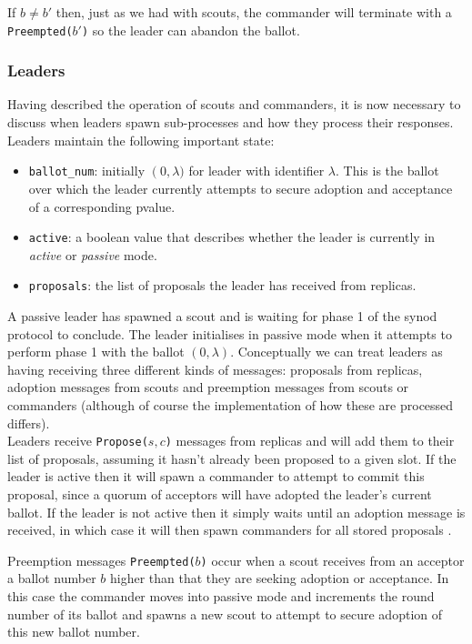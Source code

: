 If $b \neq b'$ then, just as we had with scouts, the commander will terminate with a  \texttt{Preempted($b'$)} so the leader can abandon the ballot.

\subsubsection{Leaders}

Having described the operation of scouts and commanders, it is now necessary to discuss when leaders spawn sub-processes and how they process their responses. Leaders maintain the following important state:

\begin{itemize}
  \item \texttt{ballot\_num}: initially $\left(0,\lambda)$ for leader with identifier $\lambda$. This is the ballot over which the leader currently attempts to secure adoption and acceptance of a corresponding pvalue.
  \item \texttt{active}: a boolean value that describes whether the leader is currently in \emph{active} or \emph{passive} mode.
  \item \texttt{proposals}: the list of proposals the leader has received from replicas.
\end{itemize}

A passive leader has spawned a scout and is waiting for phase 1 of the synod protocol to conclude. The leader initialises in passive mode when it attempts to perform phase 1 with the ballot $\left(0, \lambda \right)$. Conceptually we can treat leaders as having receiving three different kinds of messages: proposals from replicas, adoption messages from scouts and preemption messages from scouts or commanders (although of course the implementation of how these are processed differs). \\

Leaders receive \texttt{Propose($s,c$)} messages from replicas and will add them to their list of proposals, assuming it hasn't already been proposed to a given slot. If the leader is active then it will spawn a commander to attempt to commit this proposal, since a quorum of acceptors will have adopted the leader's current ballot. If the leader is not active then it simply waits until an adoption message is received, in which case it will then spawn commanders for all stored proposals .

Preemption messages \texttt{Preempted($b$)} occur when a scout receives from an acceptor a ballot number $b$ higher than that they are seeking adoption or acceptance. In this case the commander moves into passive mode and increments the round number of its ballot and spawns a new scout to attempt to secure adoption of this new ballot number. \\

